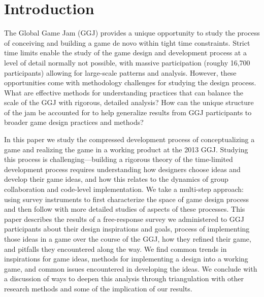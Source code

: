 \documentclass{sig-alternate}
\begin{document}
\section{Introduction}
The Global Game Jam (GGJ) provides a unique opportunity to study the process of conceiving and building a game de novo within tight time constraints. Strict time limits enable the study of the game design and development process at a level of detail normally not possible, with massive participation (roughy 16,700 participants) allowing for large-scale patterns and analysis. 
However, these opportunities come with methodology challenges for studying the design process. What are effective methods for understanding practices that can balance the scale of the GGJ with rigorous, detailed analysis? How can the unique structure of the jam be accounted for to help generalize results from GGJ participants to broader game design practices and methods?


In this paper we study the compressed development process of conceptualizing a game and realizing the game in a working product at the 2013 GGJ. Studying this process is challenging---building a rigorous theory of the time-limited development process requires understanding how designers choose ideas and develop their game ideas, and how this relates to the dynamics of group collaboration and code-level implementation. 
We take a multi-step approach: 
using survey instruments to first characterize the space of game design process
and then follow with more detailed studies of aspects of these processes.
This paper describes the results of a free-response survey we administered to GGJ participants about their design inspirations and goals, process of implementing those ideas in a game over the course of the GGJ, how they refined their game, and pitfalls they encountered along the way. 
We find common trends in inspirations for game ideas, methods for implementing a design into a working game, and common issues encountered in developing the ideas. We conclude with a discussion of ways to deepen this analysis through triangulation with other research methods and some of the implication of our results.


\end{document}
